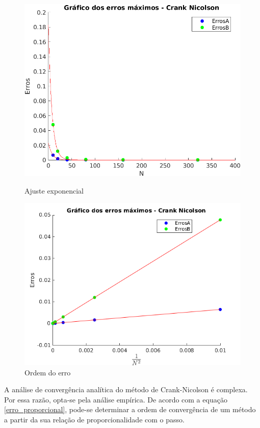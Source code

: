 \documentclass[12pt]{article}
\begin{document}
\begin{spacing}{1.5}
\begin{figure}[ht!]
\centering
    \begin{minipage}[b]{0.45\linewidth}
    \includegraphics[width=0.95\linewidth]{Segunda_Tarefa/ItemC/erro_crank.png}
    \caption{Ajuste exponencial}
    \label{fig:2C_Fit_Erro}
\end{minipage}
\quad
\begin{minipage}[b]{0.45\linewidth}
    \includegraphics[width=1\linewidth]{Segunda_Tarefa/ItemC/ordem_erro.png}
    \caption{Ordem do erro}
    \label{fig:ordem_erro_CN}
\end{minipage}
\end{figure}

A análise de convergência analítica do método de Crank-Nicolson é complexa. Por essa razão, opta-se pela análise empírica. De acordo com a equação \eqref{erro_proporcional}, pode-se determinar a ordem de convergência de um método a partir da sua relação de proporcionalidade com o passo.


\end{spacing}
\end{document}
